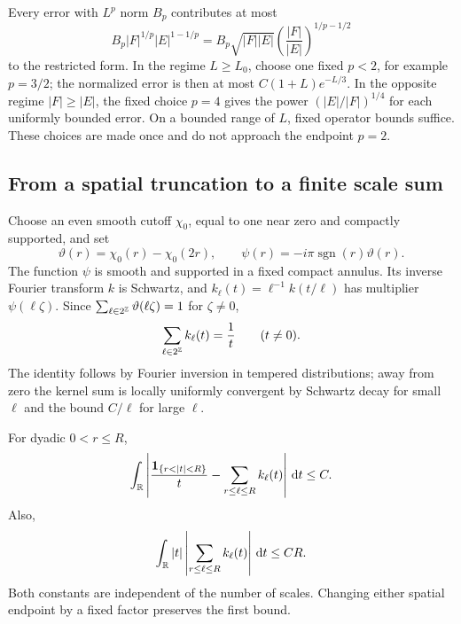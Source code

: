 Every error with \(L^p\) norm \(B_p\) contributes at most
\begin{equation}\label{red:restricted-error}
 B_p|F|^{1/p}|E|^{1-1/p}
   =B_p\sqrt{|F||E|}
           \left(\frac{|F|}{|E|}\right)^{1/p-1/2}
\end{equation}
to the restricted form. In the regime \(L\ge L_0\), choose one
fixed \(p<2\), for example \(p=3/2\); the normalized error is
then at most \(C(1+L)e^{-L/3}\). In the opposite regime
\(|F|\ge|E|\), the fixed choice \(p=4\) gives the power
\((|E|/|F|)^{1/4}\) for each uniformly bounded error. On a bounded
range of \(L\), fixed operator bounds suffice. These choices are
made once and do not approach the endpoint \(p=2\).

\subsection{From a spatial truncation to a finite scale sum}

Choose an even smooth cutoff \(\chi_0\), equal to one near zero
and compactly supported, and set
\[
 \vartheta(r)=\chi_0(r)-\chi_0(2r),\qquad
 \psi(r)=-i\pi\operatorname{sgn}(r)\vartheta(r).
\]
The function \(\psi\) is smooth and supported in a fixed compact
annulus. Its inverse Fourier transform \(k\) is Schwartz, and
\(k_\ell(t)=\ell^{-1}k(t/\ell)\) has multiplier
\(\psi(\ell\zeta)\). Since
\(\sum_{\ell\in2^{\mathbb Z}}\vartheta(\ell\zeta)=1\) for
\(\zeta\ne0\),
\[
 \sum_{\ell\in2^{\mathbb Z}}k_\ell(t)=\frac1t\qquad(t\ne0).
\]
The identity follows by Fourier inversion in tempered distributions;
away from zero the kernel sum is locally uniformly convergent by
Schwartz decay for small \(\ell\) and the bound
\(C/\ell\) for large \(\ell\).

\begin{lemma}\label{red:scale-truncation}
For dyadic \(0<r\le R\),
\begin{equation}\label{red:scale-kernel-error}
 \int_\R\left|
    \frac{\one_{\{r<|t|<R\}}}{t}
           -\sum_{r\le\ell\le R}k_\ell(t)
       \right|\dd t\le C.
\end{equation}
Also,
\begin{equation}\label{red:scale-first-moment}
 \int_\mathbb R |t|\left|\sum_{r\le\ell\le R}k_\ell(t)\right|
        \,\mathrm d t\le C R.
\end{equation}
Both constants are independent of the number of scales. Changing
either spatial endpoint by a fixed factor preserves the first bound.
\end{lemma}

